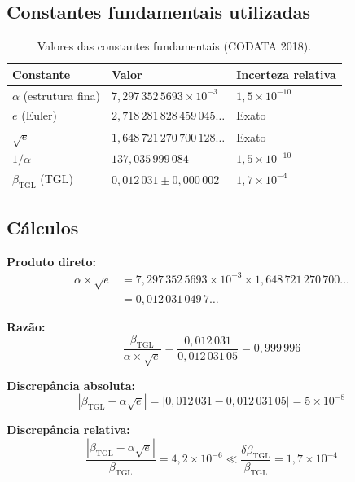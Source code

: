 \documentclass[12pt,a4paper,twoside]{article}
\newcommand{\betatgl}{\beta_{\!\scriptscriptstyle\mathrm{TGL}}}
\begin{document}
\subsection{Constantes fundamentais utilizadas}

\begin{table}[H]
\centering
\caption{Valores das constantes fundamentais (CODATA 2018).}
\label{tab:constantes}
\begin{tabular}{lll}
\toprule
\textbf{Constante} & \textbf{Valor} & \textbf{Incerteza relativa} \\
\midrule
$\alpha$ (estrutura fina) & $7{,}297\,352\,5693 \times 10^{-3}$ & $1{,}5 \times 10^{-10}$ \\
$e$ (Euler) & $2{,}718\,281\,828\,459\,045\ldots$ & Exato \\
$\sqrt{e}$ & $1{,}648\,721\,270\,700\,128\ldots$ & Exato \\
$1/\alpha$ & $137{,}035\,999\,084$ & $1{,}5 \times 10^{-10}$ \\
$\betatgl$ (TGL) & $0{,}012\,031 \pm 0{,}000\,002$ & $1{,}7 \times 10^{-4}$ \\
\bottomrule
\end{tabular}
\end{table}

\subsection{Cálculos}

\textbf{Produto direto:}
\begin{align}
\alpha \times \sqrt{e} &= 7{,}297\,352\,5693 \times 10^{-3} \times 1{,}648\,721\,270\,700\ldots \nonumber \\
&= 0{,}012\,031\,049\,7\ldots
\end{align}

\textbf{Razão:}
\begin{equation}
\frac{\betatgl}{\alpha \times \sqrt{e}} = \frac{0{,}012\,031}{0{,}012\,031\,05} = 0{,}999\,996
\end{equation}

\textbf{Discrepância absoluta:}
\begin{equation}
|\betatgl - \alpha\sqrt{e}| = |0{,}012\,031 - 0{,}012\,031\,05| = 5 \times 10^{-8}
\end{equation}

\textbf{Discrepância relativa:}
\begin{equation}
\frac{|\betatgl - \alpha\sqrt{e}|}{\betatgl} = 4{,}2 \times 10^{-6} \ll \frac{\delta\betatgl}{\betatgl} = 1{,}7 \times 10^{-4}
\end{equation}
\end{document}

